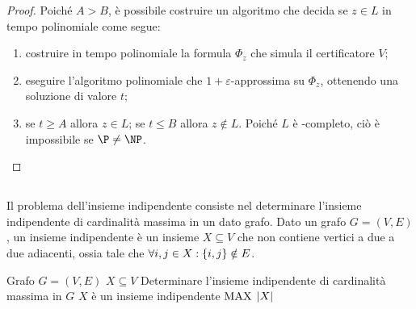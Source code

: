 \begin{proof}
	Poiché $A>B$, è possibile costruire un algoritmo che decida se $z\in L$ in tempo polinomiale come segue:
	\begin{enumerate}
		\item costruire in tempo polinomiale la formula $\Phi_z$ che simula il certificatore $V$;
		\item eseguire l'algoritmo polinomiale che $1+\varepsilon$-approssima \MaxSat su $\Phi_z$, ottenendo una soluzione di valore $t$;
		\item se $t\geq A$ allora $z\in L$; se $t\leq B$ allora $z\notin L$.
		      Poiché $L$ è \NP-completo, ciò è impossibile se $\P\neq\NP$.
	\end{enumerate}
\end{proof}


\subsection{\IndependentSet}
Il problema dell'insieme indipendente consiste nel determinare l'insieme indipendente di cardinalità massima in un dato grafo.
Dato un grafo $G=(V,E)$, un insieme indipendente è un insieme $X\subseteq V$ che non contiene vertici a due a due adiacenti, ossia tale che $\forall i,j\in X:\left\{ i,j \right\}\notin E$.

\popt{\IndependentSet}
{Grafo $G=(V,E)$}
{$X\subseteq V$}
{Determinare l'insieme indipendente di cardinalità massima in $G$}
{$X$ è un insieme indipendente}
{$\mathrm{MAX}$}
{$| X |$}

